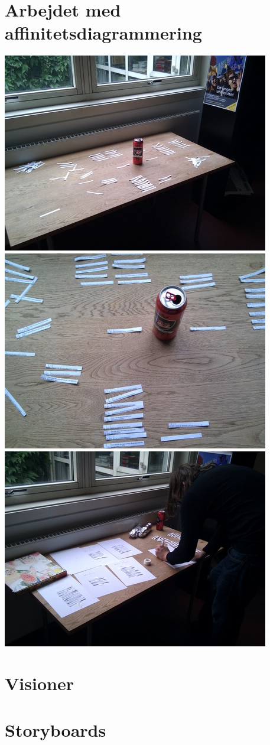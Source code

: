 \begin{appendices}
    \section{Arbejdet med affinitetsdiagrammering}
    \label{b:aff_billeder}
    \includegraphics{affinitet/IMG_20100927_145008.jpg}
    \includegraphics{affinitet/IMG_20100927_145025.jpg}
    \includegraphics{affinitet/IMG_20100927_151239.jpg}
    \section{Visioner}
    

    \section{Storyboards}
    
\end{appendices}


